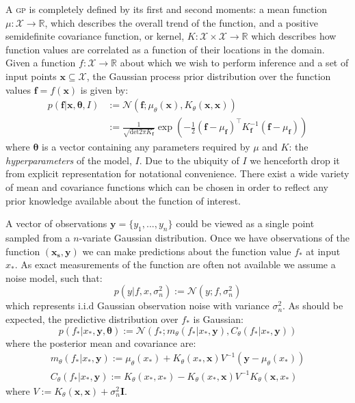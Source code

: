 \documentclass{article}
\newcommand{\vect}[1]{\mathbf{#1}}
\newcommand{\xd}{\vect{x}}
\newcommand{\yd}{\vect{y}}
\begin{document}
A {\scshape gp} is completely defined by its first and second moments: a mean function $\mu : \mathcal{X} \rightarrow \mathbb{R}$, which describes the overall trend of the function, and a positive semidefinite covariance function, or kernel, $K : \mathcal{X} \times \mathcal{X} \rightarrow \mathbb{R}$ which describes how function values are correlated as a function of their locations in the domain. Given a function $f : \mathcal{X} \rightarrow \mathbb{R}$ about which we wish to perform inference and a set of input points $\mathbf{x} \subseteq \mathcal{X}$, the Gaussian process prior distribution over the function values $\mathbf{f} = f(\mathbf{x})$ is given by:
\begin{align}
p(\mathbf{f} | \mathbf{x},\bm{\theta},I) &:= \mathcal{N}\left( \mathbf{f};\mu_\theta(\mathbf{x}),K_\theta(\mathbf{x},\mathbf{x}) \right) \nonumber \\
&:= \frac{1}{\sqrt{\mathrm{det} 2 \pi K_{\mathbf{f}}} } \exp \left( - \frac{1}{2} (\mathbf{f}-\mu_{\mathbf{f}})^\top K_\mathbf{f}^{-1} (\mathbf{f}-\mu_{\mathbf{f}})  \right)
\end{align}
where $\bm{\theta}$ is a vector containing any parameters required by $\mu$ and $K$: the \emph{hyperparameters} of the model, $I$. Due to the ubiquity of $I$ we henceforth drop it from explicit representation for notational convenience. %
There exist a wide variety of mean and covariance functions which can be chosen in order to reflect any prior knowledge available about the function of interest. 

A vector of observations $\mathbf{y} = \{ y_1,...,y_n\}$ could be viewed as a single point sampled from a $n$-variate Gaussian distribution. Once we have observations of the function $(\mathbf{x_s},\yd)$ we can make predictions about the function value $f_*$ at input $x_*$. As exact measurements of the function are often not available we assume a noise model, such that:
\begin{equation}\label{obsnoise}
p(y | f, x, \sigma_n^2) := \mathcal{N}(y; f, \sigma_n^2)
\end{equation} 
which represents i.i.d Gaussian observation noise with variance $\sigma_n^2$. As should be expected, the predictive distribution over $f_*$ is Gaussian:
\begin{equation}\label{posteriorpred}
p(f_* | x_*,\yd,\bm{\theta}) := \mathcal{N} ( f_* ; m_\theta(f_* | x_*, \yd), C_\theta(f_* | x_*, \yd))
\end{equation}
where the posterior mean and covariance are:
\begin{align}
m_\theta(f_* | x_*, \yd) := \mu_\theta(x_*) + K_\theta(x_*,\xd)V^{-1}(\yd - \mu_\theta(x_*))\\
C_\theta(f_* | x_*, \yd) := K_\theta(x_*,x_*) - K_\theta(x_*,\xd)V^{-1}K_\theta(\xd,x_*)
\end{align}
where $V := K_\theta(\xd,\xd) + \sigma_n^2\mathbf{I}$.
\end{document}
